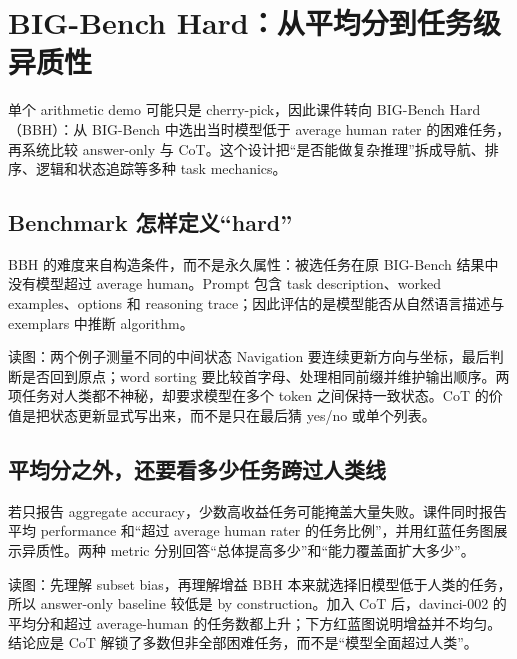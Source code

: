 \section{BIG-Bench Hard：从平均分到任务级异质性}

单个 arithmetic demo 可能只是 cherry-pick，因此课件转向 BIG-Bench Hard（BBH）：从 BIG-Bench 中选出当时模型低于 average human rater 的困难任务，再系统比较 answer-only 与 CoT。这个设计把“是否能做复杂推理”拆成导航、排序、逻辑和状态追踪等多种 task mechanics。

\subsection{Benchmark 怎样定义“hard”}

BBH 的难度来自构造条件，而不是永久属性：被选任务在原 BIG-Bench 结果中没有模型超过 average human。Prompt 包含 task description、worked examples、options 和 reasoning trace；因此评估的是模型能否从自然语言描述与 exemplars 中推断 algorithm。


\begin{knowledgebox}{读图：两个例子测量不同的中间状态}
Navigation 要连续更新方向与坐标，最后判断是否回到原点；word sorting 要比较首字母、处理相同前缀并维护输出顺序。两项任务对人类都不神秘，却要求模型在多个 token 之间保持一致状态。CoT 的价值是把状态更新显式写出来，而不是只在最后猜 yes/no 或单个列表。
\end{knowledgebox}

\subsection{平均分之外，还要看多少任务跨过人类线}

若只报告 aggregate accuracy，少数高收益任务可能掩盖大量失败。课件同时报告平均 performance 和“超过 average human rater 的任务比例”，并用红蓝任务图展示异质性。两种 metric 分别回答“总体提高多少”和“能力覆盖面扩大多少”。


\begin{knowledgebox}{读图：先理解 subset bias，再理解增益}
BBH 本来就选择旧模型低于人类的任务，所以 answer-only baseline 较低是 by construction。加入 CoT 后，davinci-002 的平均分和超过 average-human 的任务数都上升；下方红蓝图说明增益并不均匀。结论应是 CoT 解锁了多数但非全部困难任务，而不是“模型全面超过人类”。
\end{knowledgebox}

